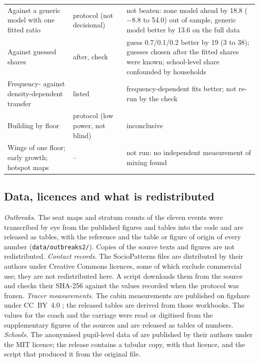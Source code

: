 {\begin{longtable}{@{}>{\raggedright}p{4.6cm}>{\raggedright}p{1.5cm}>{\raggedright\arraybackslash}p{9.4cm}@{}}
Against a generic model with one fitted ratio & protocol (not decisional) & not beaten: zone model ahead by 18.8 ($-8.8$ to 54.0) out of sample, generic model better by 13.6 on the full data \\
Against guessed shares & after, check & guess 0.7/0.1/0.2 better by 19 (3 to 38); guesses chosen after the fitted shares were known; school-level share confounded by households \\
Frequency- against density-dependent transfer & listed & frequency-dependent fits better; not re-run by the check \\
Building by floor & protocol (low power, not blind) & inconclusive \\
Wings of one floor; early growth; hotspot maps & -- & not run: no independent measurement of mixing found \\
\end{longtable}
}

\subsection{Data, licences and what is redistributed}\label{appS_prot2:sec:data}

\emph{Outbreaks.} The seat maps and stratum counts of the eleven events were transcribed by eye from the
published figures and tables into the code and are released as tables, with the reference and the table or
figure of origin of every number (\texttt{data/outbreaks2/}). Copies of the source texts and figures are not
redistributed. \emph{Contact records.} The SocioPatterns files are distributed by their authors under
Creative Commons licences, some of which exclude commercial use; they are not redistributed here. A script
downloads them from the source and checks their SHA-256 against the values recorded when the protocol was
frozen. \emph{Tracer measurements.} The cabin measurements are published on figshare under CC~BY~4.0
\citep{kinahan2021aerosol}; the released tables are derived from those workbooks. The values for the coach and
the carriage were read or digitised from the supplementary figures of the sources and are released as tables
of numbers. \emph{Schools.} The anonymised pupil-level data of \citet{endo2021within} are published by their
authors under the MIT licence; the release contains a tabular copy, with that licence, and the script that
produced it from the original file.
